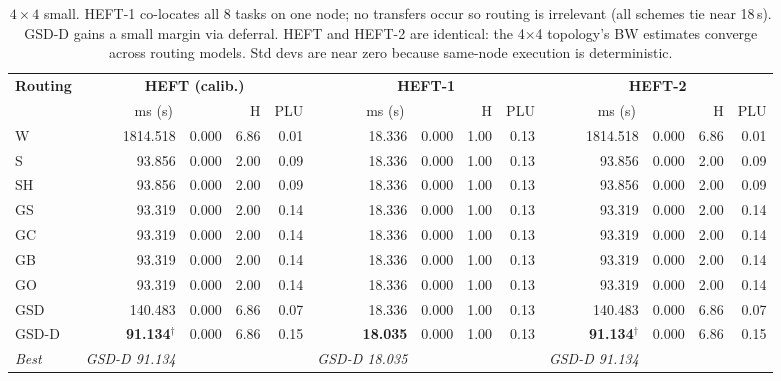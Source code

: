\documentclass[11pt]{article}
\newcommand{\win}[1]{\textcolor{green!50!black}{\textbf{#1}}}
\newcommand{\bad}[1]{\textcolor{red!70!black}{#1}}
\begin{document}
\begin{table}[H]
\centering
\small
\setlength{\tabcolsep}{4pt}
\begin{tabular}{l r@{$\,\pm\,$}l r r r@{$\,\pm\,$}l r r r@{$\,\pm\,$}l r r}
\toprule
\textbf{Routing} & \multicolumn{4}{c}{\textbf{HEFT (calib.)}} & \multicolumn{4}{c}{\textbf{HEFT-1}} & \multicolumn{4}{c}{\textbf{HEFT-2}} \\
\cmidrule(lr){2-5}\cmidrule(lr){6-9}\cmidrule(lr){10-13}
 & \multicolumn{2}{c}{ms (s)} & H & PLU & \multicolumn{2}{c}{ms (s)} & H & PLU & \multicolumn{2}{c}{ms (s)} & H & PLU \\
\midrule
W & \bad{1814.518} & 0.000 & 6.86 & 0.01 & \bad{18.336} & 0.000 & 1.00 & 0.13 & \bad{1814.518} & 0.000 & 6.86 & 0.01 \\
S & 93.856 & 0.000 & 2.00 & 0.09 & 18.336 & 0.000 & 1.00 & 0.13 & 93.856 & 0.000 & 2.00 & 0.09 \\
SH & 93.856 & 0.000 & 2.00 & 0.09 & 18.336 & 0.000 & 1.00 & 0.13 & 93.856 & 0.000 & 2.00 & 0.09 \\
GS & 93.319 & 0.000 & 2.00 & 0.14 & 18.336 & 0.000 & 1.00 & 0.13 & 93.319 & 0.000 & 2.00 & 0.14 \\
GC & 93.319 & 0.000 & 2.00 & 0.14 & 18.336 & 0.000 & 1.00 & 0.13 & 93.319 & 0.000 & 2.00 & 0.14 \\
GB & 93.319 & 0.000 & 2.00 & 0.14 & 18.336 & 0.000 & 1.00 & 0.13 & 93.319 & 0.000 & 2.00 & 0.14 \\
GO & 93.319 & 0.000 & 2.00 & 0.14 & 18.336 & 0.000 & 1.00 & 0.13 & 93.319 & 0.000 & 2.00 & 0.14 \\
GSD & 140.483 & 0.000 & 6.86 & 0.07 & 18.336 & 0.000 & 1.00 & 0.13 & 140.483 & 0.000 & 6.86 & 0.07 \\
GSD\mbox{-}D & \textbf{91.134}$^\dagger$ & 0.000 & 6.86 & 0.15 & \win{18.035} & 0.000 & 1.00 & 0.13 & \textbf{91.134}$^\dagger$ & 0.000 & 6.86 & 0.15 \\
\midrule
\textit{Best} & \textit{GSD-D 91.134} &  &  &  & \textit{GSD-D 18.035} &  &  &  & \textit{GSD-D 91.134} &  &  &  \\
\bottomrule
\end{tabular}
\caption{$4\times4$ small. HEFT-1 co-locates all 8 tasks on one node; no transfers occur so routing is irrelevant (all schemes tie near 18\,s). GSD-D gains a small margin via deferral. HEFT and HEFT-2 are identical: the 4$\times$4 topology's BW estimates converge across routing models. Std devs are near zero because same-node execution is deterministic.}
\end{table}
\end{document}
